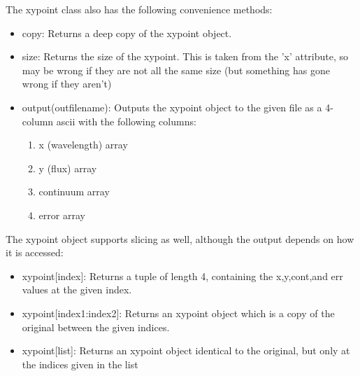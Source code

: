 \documentclass{article}
\begin{document}
\begin{itemize}
The xypoint class also has the following convenience methods:
\begin{itemize}

  \item copy: Returns a deep copy of the xypoint object.
  \item size: Returns the size of the xypoint. This is taken from the 'x' attribute, so may be wrong if they are not all the same size (but something has gone wrong if they aren't)
  \item output(outfilename): Outputs the xypoint object to the given file as a 4-column ascii with the following columns:
  \begin{enumerate}
    \item x (wavelength) array
    \item y (flux) array
    \item continuum array
    \item error array
  \end{enumerate}
  
  
\end{itemize}
  
The xypoint object supports slicing as well, although the output depends on how it is accessed:
\begin{itemize}

  \item xypoint[index]: Returns a tuple of length 4, containing the x,y,cont,and err values at the given index.
  \item xypoint[index1:index2]: Returns an xypoint object which is a copy of the original between the given indices. 
  \item xypoint[list]: Returns an xypoint object identical to the original, but only at the indices given in the list

\end{itemize}




\end{itemize}










%
\end{document}
